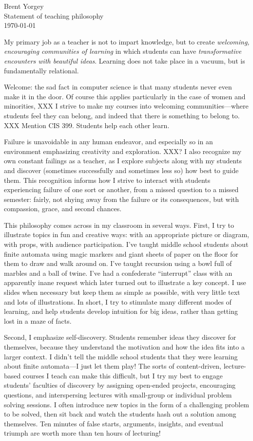 \documentclass{article}
\begin{document}
\noindent Brent Yorgey \\
Statement of teaching philosophy \\
\today
\bigskip

My primary job as a teacher is not to impart knowledge, but to create
\emph{welcoming, encouraging communities of learning} in which students can
have \emph{transformative encounters with beautiful ideas}.  Learning
does not take place in a vacuum, but is fundamentally relational.

Welcome: the sad fact in computer science is that many students never
even make it in the door.  Of course this applies particularly in the
case of women and minorities, XXX
I strive to make my courses into welcoming communities---where
students feel they can belong, and indeed that there is something to
belong to.  XXX Mention CIS 399. Students help each other learn.

Failure is unavoidable in any human endeavor, and especially so in an
environment emphasizing creativity and exploration.  XXX? I also
recognize my own constant failings as a teacher, as I explore subjects
along with my students and discover (sometimes successfully and
sometimes less so) how best to guide them.  This recognition informs
how I strive to interact with students experiencing failure of one
sort or another, from a missed question to a missed semester: fairly,
not shying away from the failure or its consequences, but with
compassion, grace, and second chances.

This philosophy comes across in my classroom in several ways. First, I
try to illustrate topics in fun and creative ways: with an appropriate
picture or diagram, with props, with audience participation.  I've
taught middle school students about finite automata using magic
markers and giant sheets of paper on the floor for them to draw and
walk around on.  I've taught recursion using a bowl full of marbles
and a ball of twine.  I've had a confederate ``interrupt'' class with
an apparently inane request which later turned out to illustrate a key
concept.  I use slides when necessary but keep them as simple as
possible, with very little text and lots of illustrations.  In short,
I try to stimulate many different modes of learning, and help students
develop intuition for big ideas, rather than getting lost in a maze of
facts.

Second, I emphasize self-discovery. Students remember ideas they
discover for themselves, because they understand the motivation and
how the idea fits into a larger context. I didn't tell the middle
school students that they were learning about finite automata---I just
let them play! The sorts of content-driven, lecture-based courses I
teach can make this difficult, but I try my best to engage students'
faculties of discovery by assigning open-ended projects, encouraging
questions, and interspersing lectures with small-group or individual
problem solving sessions.  I often introduce new topics in the form of
a challenging problem to be solved, then sit back and watch the
students hash out a solution among themselves.  Ten minutes of false
starts, arguments, insights, and eventual triumph are worth more than
ten hours of lecturing!
\end{document}
